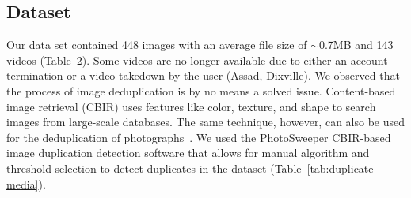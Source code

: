 \subsection{Dataset}
Our data set contained 448 images with an average file size of $\sim$0.7MB and 143 videos (Table~2). Some videos are no longer available due to either an account termination or a video takedown by the user (Assad, Dixville). We observed that the process of image deduplication is by no means a solved issue. Content-based image retrieval (CBIR) uses features like color, texture, and shape to search images from large-scale databases. The same technique, however, can also be used for the deduplication of photographs~\cite{Pattabhi:RAICS11}. We used the PhotoSweeper CBIR-based image duplication detection software that allows for manual algorithm and threshold selection to detect duplicates in the dataset (Table~\ref{tab:duplicate-media}). \begin{table}[htbp]
\end{table}
